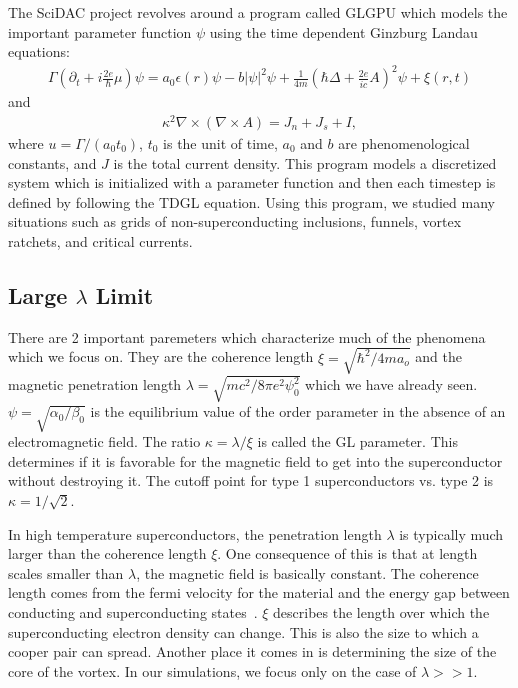 The SciDAC project revolves around a program called {\sc GLGPU} which models the important parameter function $\psi$ using the time dependent Ginzburg Landau equations:
\begin{eqnarray}
\Gamma (\partial_t +i \frac{2e}{\hbar}\mu)\psi = a_0 \epsilon (r) \psi - b |\psi|^2 \psi + \frac{1}{4m} (\hbar \Delta + \frac{2e}{ic} A)^2 \psi + \xi (r,t)
\label{TDGL1}
\end{eqnarray}
and
\begin{eqnarray}
\kappa^2 \nabla \times (\nabla \times A) = J_n + J_s + I,
\label{TDGL2}
\end{eqnarray}
where $u = \Gamma/(a_0 t_0)$, $t_0$ is the unit of time, $a_0$ and $b$ are phenomenological constants, and $J$ is the total current density. This program models a discretized system which is initialized with a parameter function and then each timestep is defined by following the TDGL equation. Using this program, we studied many situations such as grids of non-superconducting inclusions, funnels, vortex ratchets, and critical currents.


\subsection{Large $\lambda$ Limit}
There are 2 important paremeters which characterize much of the phenomena which we focus on. They are the coherence length $\xi = \sqrt{\hbar^2/4ma_o}$ and the magnetic penetration length $\lambda = \sqrt{mc^2 / 8\pi e^2 \psi^2_0}$ which we have already seen. $\psi = \sqrt{\alpha_0/\beta_0}$ is the equilibrium value of the order parameter in the absence of an electromagnetic field. The ratio $\kappa = \lambda / \xi$ is called the GL parameter. This determines if it is favorable for the magnetic field to get into the superconductor without destroying it. The cutoff point for type 1 superconductors vs. type 2 is $\kappa = 1/\sqrt{2}$. 

 In high temperature superconductors, the penetration length $\lambda$ is typically much larger than the coherence length $\xi$. One consequence of this is that at length scales smaller than $\lambda$, the magnetic field is basically constant. The coherence length comes from the fermi velocity for the material and the energy gap between conducting and superconducting states~\cite{Kittel96}.  $\xi$ describes the length over which the superconducting electron density can change. This is also the size to which a cooper pair can spread. Another place it comes in is determining the size of the core of the vortex. In our simulations, we focus only on the case of $\lambda >> 1$.



